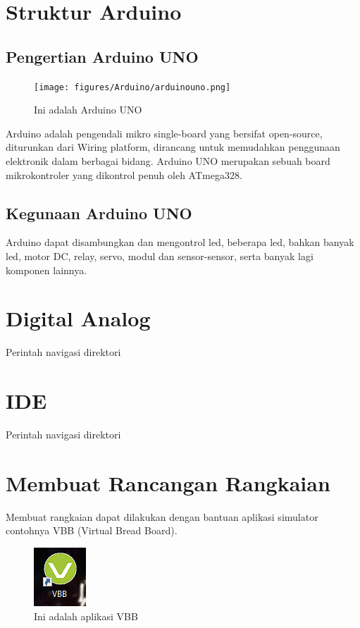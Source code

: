 \section{Struktur Arduino}
\subsection{Pengertian Arduino UNO}
\begin{figure}[!htbp]
  \centering
  \texttt{[image: figures/Arduino/arduinouno.png]}
  \caption{Ini adalah Arduino UNO}\label{fig:arduinouno}
\end{figure}
Arduino adalah pengendali mikro single-board yang bersifat open-source, diturunkan dari Wiring platform, dirancang untuk memudahkan penggunaan elektronik dalam berbagai bidang. Arduino UNO merupakan sebuah board mikrokontroler yang dikontrol penuh oleh ATmega328.

\subsection{Kegunaan Arduino UNO}
Arduino dapat disambungkan dan mengontrol led, beberapa led, bahkan banyak led, motor DC, relay, servo, modul dan sensor-sensor, serta banyak lagi komponen lainnya.

\section{Digital Analog}
Perintah navigasi direktori

\section{IDE}
Perintah navigasi direktori

\section{Membuat Rancangan Rangkaian}
    Membuat rangkaian dapat dilakukan dengan bantuan aplikasi simulator contohnya VBB (Virtual Bread Board).
\begin{figure}[!htbp]
  \centering
  \includegraphics[width=.45\textwidth]{figures/VBB/vbb.png}
  \caption{Ini adalah aplikasi VBB}\label{fig:vbb}
\end{figure}

